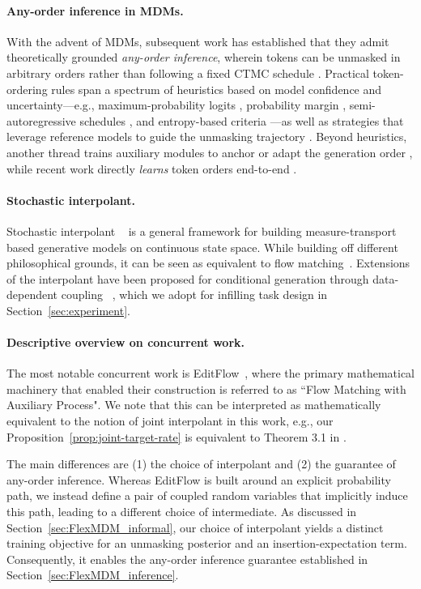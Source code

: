 \paragraph{Any-order inference in MDMs.}
With the advent of MDMs, subsequent work has established that they admit theoretically grounded \emph{any-order inference}, wherein tokens can be unmasked in arbitrary orders rather than following a fixed CTMC schedule \citep{kim2025train,peng2025path}. Practical token-ordering rules span a spectrum of heuristics based on model confidence and uncertainty—e.g., maximum-probability logits \citep{chang2022maskgit,zheng2024masked}, probability margin \citep{kim2025train}, semi-autoregressive schedules \citep{nie2024scaling}, and entropy-based criteria \citep{ben2025accelerated}—as well as strategies that leverage reference models to guide the unmasking trajectory \citep{peng2025path}. Beyond heuristics, another thread trains auxiliary modules to anchor or adapt the generation order \citep{rout2025anchored}, while recent work directly \emph{learns} token orders end-to-end \citep{ma2025reinforced,wang2025learning}.


\paragraph{Stochastic interpolant.} Stochastic interpolant ~\citep{albergo2022building, albergo2023stochastic} is a general framework for building measure-transport based generative models on continuous state space. While building off different philosophical grounds, it can be seen as equivalent to flow matching~\citep{lipman2022flow, liu2022flowstraightfastlearning}. Extensions of the interpolant have been proposed for conditional generation through data-dependent coupling ~\citep{albergo2024stochastic}, which we adopt for infilling task design in Section~\ref{sec:experiment}.


\paragraph{Descriptive overview on concurrent work.} The most notable concurrent work is EditFlow~\citep{havasi2025edit}, where the primary mathematical machinery that enabled their construction is referred to as ``Flow Matching with Auxiliary Process". We note that this can be interpreted as mathematically equivalent to the notion of joint interpolant in this work, e.g., our Proposition~\ref{prop:joint-target-rate} is equivalent to Theorem 3.1 in \cite{havasi2025edit}.

The main differences are (1) the choice of interpolant and (2) the guarantee of any-order inference. Whereas EditFlow is built around an explicit probability path, we instead define a pair of coupled random variables that implicitly induce this path, leading to a different choice of intermediate. As discussed in Section~\ref{sec:FlexMDM_informal}, our choice of interpolant yields a distinct training objective for an unmasking posterior and an insertion-expectation term. Consequently, it enables the any-order inference guarantee established in Section~\ref{sec:FlexMDM_inference}. 
